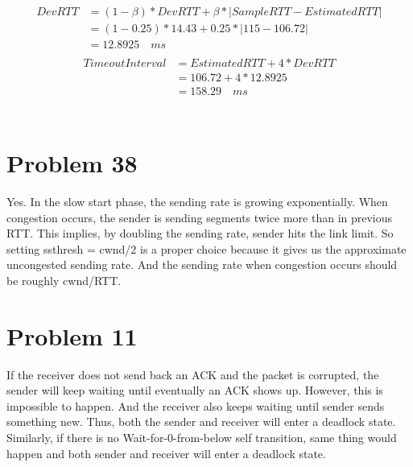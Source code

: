 \documentclass[titlepage, paper=a4, fontsize=11pt]{scrartcl} %
\numberwithin{equation}{section} %
\numberwithin{table}{section} %
\begin{document}
\begin{align*} 
\begin{split}
DevRTT &= (1-\beta)*DevRTT + \beta * | SampleRTT - EstimatedRTT | \\
&= (1-0.25)*14.43 + 0.25 * | 115 - 106.72 | \\
&= 12.8925 \quad ms
\end{split}					
\end{align*}
\begin{align*} 
\begin{split}
TimeoutInterval &= EstimatedRTT + 4*DevRTT \\
&= 106.72 + 4*12.8925 \\
&= 158.29 \quad ms
\end{split}					
\end{align*}
\\


\section*{Problem 38}
Yes. In the slow start phase, the sending rate is growing exponentially. When congestion occurs,
the sender is sending segments twice more than in previous RTT. This implies, by doubling the sending
rate, sender hits the link limit. So setting ssthresh = cwnd/2 is a proper choice because it gives us
the approximate uncongested sending rate. And the sending rate when congestion occurs should be
roughly cwnd/RTT.




\section*{Problem 11}
If the receiver does not send back an ACK and the packet is corrupted, the sender will keep waiting until eventually an ACK shows up.
However, this is impossible to happen. And the receiver also keeps waiting until sender sends something
new. Thus, both the sender and receiver will enter a deadlock state. \\

Similarly, if there is no Wait-for-0-from-below self transition, same thing would happen and both sender
and receiver will enter a deadlock state.
\\
\end{document}
